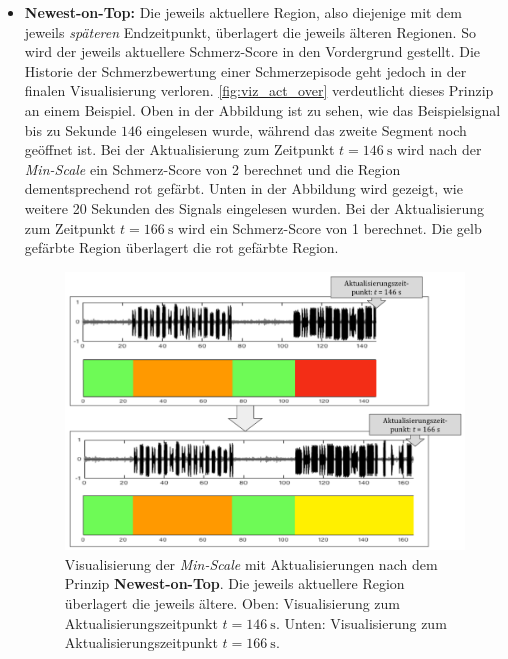\begin{itemize}
\item \textbf{Newest-on-Top: } Die jeweils \glqq aktuellere\grqq{} Region, also diejenige mit dem jeweils \emph{späteren} Endzeitpunkt, überlagert die jeweils \glqq älteren\grqq{} Regionen. So wird der jeweils aktuellere Schmerz-Score in den Vordergrund gestellt. Die Historie der Schmerzbewertung einer Schmerzepisode geht jedoch in der finalen Visualisierung verloren. \autoref{fig:viz_act_over} verdeutlicht dieses Prinzip an einem Beispiel. Oben in der Abbildung ist zu sehen, wie das Beispielsignal bis zu Sekunde $146$ eingelesen wurde, während das zweite Segment noch geöffnet ist. Bei der Aktualisierung zum Zeitpunkt $t=\SI{146}{\second}$ wird nach der \emph{Min-Scale} ein Schmerz-Score von 2 berechnet und die Region dementsprechend rot gefärbt. Unten in der Abbildung wird gezeigt, wie weitere 20 Sekunden des Signals eingelesen wurden. Bei der Aktualisierung zum Zeitpunkt $t=\SI{166}{\second}$ wird ein Schmerz-Score von 1 berechnet. Die gelb gefärbte Region überlagert die rot gefärbte Region.

\begin{figure}[h]
	\centering
	\includegraphics[width=1\textwidth]{bilder/viz_act_over_03.png}
	\caption[Visualisierung der bei Aktualisierungen mit Priorisierung der aktuelleren Schmerzbewertung]{Visualisierung der \emph{Min-Scale} mit Aktualisierungen nach dem Prinzip \textbf{Newest-on-Top}. Die jeweils \glqq aktuellere\grqq{} Region überlagert die jeweils \glqq ältere\grqq{}. Oben: Visualisierung zum Aktualisierungszeitpunkt $t=\SI{146}{\second}$. Unten: Visualisierung zum Aktualisierungszeitpunkt $t=\SI{166}{\second}$.}
	\label{fig:viz_act_over}
\end{figure}


\end{itemize}
